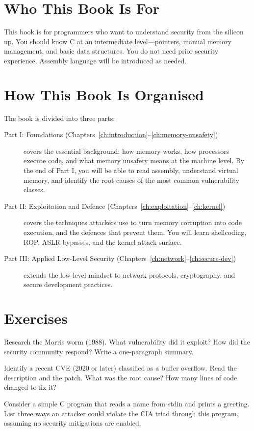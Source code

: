 \section{Who This Book Is For}

This book is for programmers who want to understand security from the silicon up. You should know C at an intermediate level---pointers, manual memory management, and basic data structures. You do not need prior security experience. Assembly language will be introduced as needed.

\section{How This Book Is Organised}

The book is divided into three parts:

\begin{description}
	\item[Part I: Foundations (Chapters~\ref{ch:introduction}--\ref{ch:memory-unsafety})] covers the essential background: how memory works, how processors execute code, and what memory unsafety means at the machine level. By the end of Part I, you will be able to read assembly, understand virtual memory, and identify the root causes of the most common vulnerability classes.
	\item[Part II: Exploitation and Defence (Chapters~\ref{ch:exploitation}--\ref{ch:kernel})] covers the techniques attackers use to turn memory corruption into code execution, and the defences that prevent them. You will learn shellcoding, ROP, ASLR bypasses, and the kernel attack surface.
	\item[Part III: Applied Low-Level Security (Chapters~\ref{ch:network}--\ref{ch:secure-dev})] extends the low-level mindset to network protocols, cryptography, and secure development practices.
\end{description}

\section{Exercises}

\begin{exercise}
	Research the Morris worm (1988). What vulnerability did it exploit? How did the security community respond? Write a one-paragraph summary.
\end{exercise}

\begin{exercise}
	Identify a recent CVE (2020 or later) classified as a buffer overflow. Read the description and the patch. What was the root cause? How many lines of code changed to fix it?
\end{exercise}

\begin{exercise}
	Consider a simple C program that reads a name from stdin and prints a greeting. List three ways an attacker could violate the CIA triad through this program, assuming no security mitigations are enabled.
\end{exercise}
